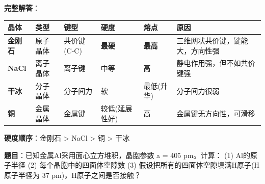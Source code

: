\textbf{完整解答}：

{\def\LTcaptype{none} %
\begin{longtable}[]{@{}
  >{\raggedright\arraybackslash}p{}
  >{\raggedright\arraybackslash}p{}
  >{\raggedright\arraybackslash}p{}
  >{\centering\arraybackslash}p{}
  >{\centering\arraybackslash}p{}
  >{\raggedright\arraybackslash}p{}@{}}
\toprule\noalign{}
\begin{minipage}[b]{\linewidth}\raggedright
晶体
\end{minipage} & \begin{minipage}[b]{\linewidth}\raggedright
类型
\end{minipage} & \begin{minipage}[b]{\linewidth}\raggedright
键型
\end{minipage} & \begin{minipage}[b]{\linewidth}\centering
硬度
\end{minipage} & \begin{minipage}[b]{\linewidth}\centering
熔点
\end{minipage} & \begin{minipage}[b]{\linewidth}\raggedright
原因
\end{minipage} \\
\midrule\noalign{}
\endhead
\bottomrule\noalign{}
\endlastfoot
\textbf{金刚石} & 原子晶体 & 共价键(C-C) & \textbf{最硬} & \textbf{最高} & 三维网状共价键，键能大，方向性强 \\
\textbf{NaCl} & 离子晶体 & 离子键 & 中等 & 高 & 静电作用强，但不如共价键强 \\
\textbf{干冰} & 分子晶体 & 分子间力 & 软 & 最低(升华) & 分子间力很弱 \\
\textbf{铜} & 金属晶体 & 金属键 & 较低(延展性好) & 高 & 金属键无方向性，可滑移 \\
\end{longtable}
}

\textbf{硬度顺序}：金刚石 \textgreater{} NaCl \textgreater{} 铜 \textgreater{} 干冰

\textbf{题目}：已知金属Al采用面心立方堆积，晶胞参数 a = 405 pm。计算：
(1) Al的原子半径
(2) 每个晶胞中的四面体空隙数
(3) 假设把所有的四面体空隙填满H原子(H原子半径为 37 pm)，H原子之间是否接触？

